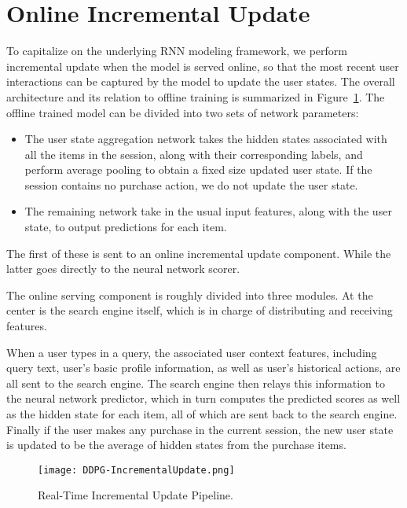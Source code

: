 \section{Online Incremental Update}
To capitalize on the underlying RNN modeling framework, we perform incremental update when the model is served online, so that the most recent user interactions can be captured by the model to update the user states. The overall architecture and its relation to offline training is summarized in Figure~\ref{fig:incremental_update}. The offline trained model can be divided into two sets of network parameters: 
\begin{itemize}
    \item The user state aggregation network takes the hidden states associated with all the items in the session, along with their corresponding labels, and perform average pooling to obtain a fixed size updated user state. If the session contains no purchase action, we do not update the user state.
    \item The remaining network take in the usual input features, along with the user state, to output predictions for each item.
\end{itemize}
The first of these is sent to an online incremental update component. While the latter goes directly to the neural network scorer.

The online serving component is roughly divided into three modules. At the center is the search engine itself, which is in charge of distributing and receiving features. 

When a user types in a query, the associated user context features, including query text, user's basic profile information, as well as user's historical actions, are all sent to the search engine. The search engine then relays this information to the neural network predictor, which in turn computes the predicted scores as well as the hidden state for each item, all of which are sent back to the search engine. Finally if the user makes any purchase in the current session, the new user state is updated to be the average of hidden states from the purchase items. 

\begin{figure}
    \centering
    \texttt{[image: DDPG-IncrementalUpdate.png]}
    \caption{Real-Time Incremental Update Pipeline.}
    \label{fig:incremental_update}
\vspace{10pt}
\end{figure}

